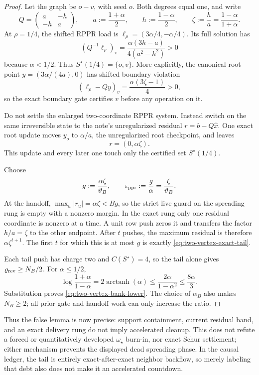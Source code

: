 \begin{proof}
Let the graph be $o-v$, with seed $o$.  Both degrees equal one, and write
\[
 Q=\begin{pmatrix}a&-h\\-h&a\end{pmatrix},
 \qquad
 a:=\frac{1+\alpha}{2},
 \qquad
 h:=\frac{1-\alpha}{2},
 \qquad
 \zeta:=\frac{h}{a}=\frac{1-\alpha}{1+\alpha}.
\]
At $\rho=1/4$, the shifted RPPR load is
$\ell_\rho=(3\alpha/4,-\alpha/4)$.  Its full solution has
\[
 (Q^{-1}\ell_\rho)_v
 =\frac{\alpha(3h-a)}{4(a^2-h^2)}>0
\]
because $\alpha<1/2$.  Thus $S^\star(1/4)=\{o,v\}$.  More explicitly, the
canonical root point $y=(3\alpha/(4a),0)$ has shifted boundary violation
\[
 (\ell_\rho-Qy)_v=\frac{\alpha(3\zeta-1)}4>0,
\]
so the exact boundary gate certifies $v$ before any operation on it.

Do not settle the enlarged two-coordinate RPPR system.  Instead switch on
the same irreversible state to the note's unregularized residual
$r=b-Q\widehat x$.  One exact root update moves $y_o$ to $\alpha/a$, the
unregularized root checkpoint, and leaves
\begin{equation}
 r=(0,\alpha\zeta).
 \label{eq:two-vertex-handoff}
\end{equation}
This update and every later one touch only the certified set
$S^\star(1/4)$.

Choose
\[
 g:=\frac{\alpha\zeta}{\vartheta_B},
 \qquad
 \varepsilon_{\mathrm{ppr}}:=\frac g\alpha=\frac{\zeta}{\vartheta_B}.
\]
At the handoff, $\max_u|r_u|=\alpha\zeta<Bg$, so the strict live guard on
the spreading rung is empty with a nonzero margin.  In the exact rung only
one residual coordinate is nonzero at a time.  A unit row push zeros it and
transfers the factor $h/a=\zeta$ to the other endpoint.  After $t$ pushes,
the maximum residual is therefore $\alpha\zeta^{t+1}$.  The first $t$ for
which this is at most $g$ is exactly \eqref{eq:two-vertex-exact-tail}.

Each tail push has charge two and $C(S^\star)=4$, so the tail alone gives
$\varrho_{\rm rev}\geq N_B/2$.  For $\alpha\leq1/2$,
\[
 \log\frac{1+\alpha}{1-\alpha}
 =2\operatorname{arctanh}(\alpha)
 \leq\frac{2\alpha}{1-\alpha^2}
 \leq\frac{8\alpha}{3}.
\]
Substitution proves \eqref{eq:two-vertex-bank-lower}.  The choice of
$\alpha_B$ also makes $N_B\geq2$; all prior gate and handoff work can only
increase the ratio.
\end{proof}

Thus the false lemma is now precise: support containment, current residual
band, and an exact delivery rung do not imply accelerated cleanup.  This
does not refute a forced or quantitatively developed $\omega_\star$ burn-in,
nor exact Schur settlement; either mechanism prevents the displayed dead
spreading phase.  In the causal ledger, the tail is entirely
exact-after-exact neighbor backflow, so merely labeling that debt also does
not make it an accelerated countdown.

